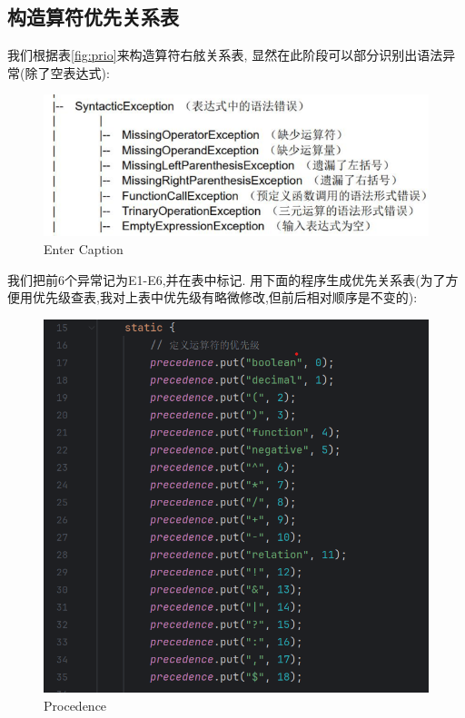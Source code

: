 \documentclass{article}
\begin{document}
\newpage


\subsection{构造算符优先关系表}
我们根据表\ref{fig:prio}来构造算符右舷关系表,
显然在此阶段可以部分识别出语法异常(除了空表达式):
\begin{figure}[H]
    \centering
    \includegraphics[width=0.5\linewidth]{exc.png}
    \caption{Enter Caption}
    \label{fig:enter-label}
\end{figure}
我们把前6个异常记为E1-E6,并在表中标记.
用下面的程序生成优先关系表(为了方便用优先级查表,我对上表中优先级有略微修改,但前后相对顺序是不变的):
\begin{figure}[H]
    \centering
    \includegraphics[width=0.6\linewidth]{image21.png}
    \caption{Procedence}
    \label{fig:image21}
\end{figure}
\end{document}
